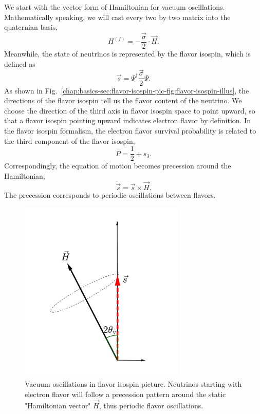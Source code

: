 We start with the vector form of Hamiltonian for vacuum oscillations. Mathematically speaking, we will cast every two by two matrix into the quaternian basis,
\begin{equation}
    H^{(f)} = - \frac{\vec{\sigma} }{2}\cdot \vec H.
\end{equation}
Meanwhile, the state of neutrinos is represented by the flavor isospin, which is defined as
\begin{equation}
    \vec s = \Psi^{\dagger} \frac{\vec{\sigma} }{2} \Psi.
\end{equation}
As shown in Fig.~\ref{chap:basics-sec:flavor-isospin-pic-fig:flavor-isospin-illus}, the directions of the flavor isospin tell us the flavor content of the neutrino. We choose the direction of the third axis in flavor isospin space to point upward, so that a flavor isospin pointing upward indicates electron flavor by definition. In the flavor isospin formalism, the electron flavor survival probability is related to the third component of the flavor isospin,
\begin{equation*}
P = \frac{1}{2} + s_3.
\end{equation*}
Correspondingly, the equation of motion becomes precession around the Hamiltonian,
\begin{equation}
\dot{\vec s} = \vec s \times \vec H.
\label{chap:basics-sec:flavor-isospin-pic-eqn:eom-precession}
\end{equation}
The precession corresponds to periodic oscillations between flavors.

\begin{figure}
    \centering
    \vspace*{-20pt}
    \includegraphics[width=0.7\textwidth]{chapters/assets/basics/flavor-isospin-vac-osc}
    \caption{Vacuum oscillations in flavor isospin picture. Neutrinos starting with electron flavor will follow a precession pattern around the static "Hamiltonian vector" $\vec H$, thus periodic flavor oscillations.}
    \label{chap:basics-sec:flavor-isospin-pic-fig:flavor-isospin-vac-osc}
\end{figure}



